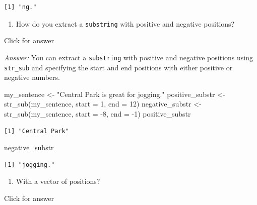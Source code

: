 \documentclass[
]{book}
\newenvironment{Shaded}{\begin{snugshade}}{\end{snugshade}}
\newcommand{\AttributeTok}[1]{\textcolor[rgb]{0.77,0.63,0.00}{#1}}
\newcommand{\DecValTok}[1]{\textcolor[rgb]{0.00,0.00,0.81}{#1}}
\newcommand{\FunctionTok}[1]{\textcolor[rgb]{0.00,0.00,0.00}{#1}}
\newcommand{\NormalTok}[1]{#1}
\newcommand{\OtherTok}[1]{\textcolor[rgb]{0.56,0.35,0.01}{#1}}
\newcommand{\SpecialCharTok}[1]{\textcolor[rgb]{0.00,0.00,0.00}{#1}}
\newcommand{\StringTok}[1]{\textcolor[rgb]{0.31,0.60,0.02}{#1}}
\providecommand{\tightlist}{%
  \setlength{\itemsep}{0pt}\setlength{\parskip}{0pt}}
\begin{document}
\begin{verbatim}
[1] "ng."
\end{verbatim}

\begin{enumerate}
\def\labelenumi{\alph{enumi}.}
\setcounter{enumi}{7}
\tightlist
\item
  How do you extract a \texttt{substring} with positive and negative positions?
\end{enumerate}

Click for answer

\emph{Answer:} You can extract a \texttt{substring} with positive and negative positions using \texttt{str\_sub} and specifying the start and end positions with either positive or negative numbers.

\begin{Shaded}
\begin{Highlighting}[]
\NormalTok{my\_sentence }\OtherTok{\textless{}{-}} \StringTok{"Central Park is great for jogging."}
\NormalTok{positive\_substr }\OtherTok{\textless{}{-}} \FunctionTok{str\_sub}\NormalTok{(my\_sentence, }\AttributeTok{start =} \DecValTok{1}\NormalTok{, }\AttributeTok{end =} \DecValTok{12}\NormalTok{)}
\NormalTok{negative\_substr }\OtherTok{\textless{}{-}} \FunctionTok{str\_sub}\NormalTok{(my\_sentence, }\AttributeTok{start =} \SpecialCharTok{{-}}\DecValTok{8}\NormalTok{, }\AttributeTok{end =} \SpecialCharTok{{-}}\DecValTok{1}\NormalTok{)}
\NormalTok{positive\_substr}
\end{Highlighting}
\end{Shaded}

\begin{verbatim}
[1] "Central Park"
\end{verbatim}

\begin{Shaded}
\begin{Highlighting}[]
\NormalTok{negative\_substr}
\end{Highlighting}
\end{Shaded}

\begin{verbatim}
[1] "jogging."
\end{verbatim}

\begin{enumerate}
\def\labelenumi{\roman{enumi}.}
\tightlist
\item
  With a vector of positions?
\end{enumerate}

Click for answer
\end{document}
